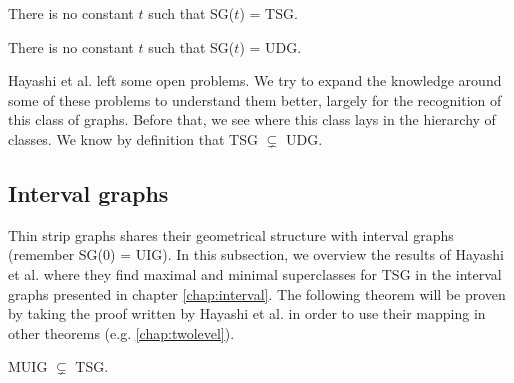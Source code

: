 \begin{theorem}
  There is no constant $t$ such that SG($t$) = TSG.
\end{theorem}

\begin{theorem}
  There is no constant $t$ such that SG($t$) = UDG.
\end{theorem}

Hayashi et al. left some open problems. We try to expand the knowledge around some of these problems
to understand them better, largely for the recognition of this class of graphs. Before that, we see where this class lays in the hierarchy of classes. We know by definition that TSG $\subsetneq$ UDG.

\subsection{Interval graphs}

Thin strip graphs shares their geometrical structure with interval graphs (remember SG($0$) = UIG). In this subsection, we overview the results of Hayashi et al. \cite{hayashiThinStripGraphs2017} where they find maximal and minimal superclasses for TSG in the interval graphs presented in chapter \ref{chap:interval}. The following theorem will be proven by taking the proof written by Hayashi et al. in order to use their mapping in other theorems (e.g. \ref{chap:twolevel}).

\begin{theorem}
  \label{theo:muigTSG}
  MUIG $\subsetneq$ TSG.
\end{theorem}

